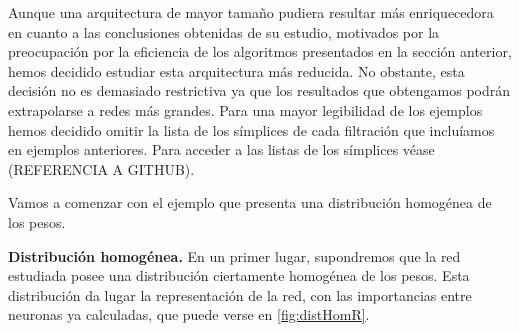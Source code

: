 \documentclass[12pt, a4paper, twoside]{book}
\numberwithin{equation}{section}
\theoremstyle{definition}
\newenvironment{ejem}
  {\pushQED{\qed}\renewcommand{\qedsymbol}{$\blacktriangleleft$}\ejemplo}
  {\popQED\endejemplo}
\theoremstyle{remark}
\theoremstyle{plain}
\begin{document}
	Aunque una arquitectura de mayor tamaño pudiera resultar más 
	enriquecedora en 
	cuanto a las conclusiones obtenidas de su estudio, motivados por la 
	preocupación por la eficiencia de los algoritmos presentados en la 
	sección anterior, hemos decidido estudiar esta arquitectura más 
	reducida. No obstante, esta decisión no es demasiado restrictiva ya 
	que los resultados que obtengamos podrán extrapolarse a redes más 
	grandes. Para una mayor legibilidad de los ejemplos hemos decidido 
	omitir la lista de los símplices de cada filtración que incluíamos en 
	ejemplos anteriores. Para acceder a las listas de los símplices véase 
	(REFERENCIA A GITHUB).

	Vamos a comenzar con el ejemplo que presenta una distribución 
	homogénea de los pesos.

	\begin{ejem}\textbf{Distribución homogénea.}
	En un primer lugar, supondremos que la red estudiada posee una 
	distribución ciertamente homogénea de los pesos. Esta distribución da 
	lugar la representación de la red, con las importancias entre neuronas
	ya calculadas, que puede verse en \autoref{fig:distHomR}.
	
	\begin{figure}[!htbp]
			\centering
\end{figure}
\end{ejem}
\end{document}
